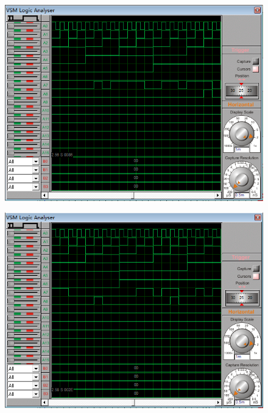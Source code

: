 \documentclass{article}
\begin{document}
\begin{figure}[!hbp]
  \centering
  \includegraphics[scale=0.5]{4/3.png}
\end{figure}

\begin{figure}[!hbp]
  \centering
  \includegraphics[scale=0.5]{4/4.png}
\end{figure}
\end{document}
